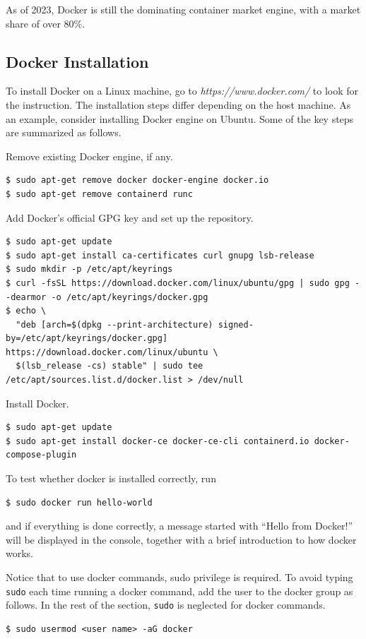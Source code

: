 As of 2023, Docker is still the dominating container market engine, with a market share of over $80\%$.

\subsection{Docker Installation}

To install Docker on a Linux machine, go to \textit{https://www.docker.com/} to look for the instruction. The installation steps differ depending on the host machine. As an example, consider installing Docker engine on Ubuntu. Some of the key steps are summarized as follows.

Remove existing Docker engine, if any.
\begin{lstlisting}
$ sudo apt-get remove docker docker-engine docker.io
$ sudo apt-get remove containerd runc
\end{lstlisting}
Add Docker's official GPG key and set up the repository.
\begin{lstlisting}
$ sudo apt-get update
$ sudo apt-get install ca-certificates curl gnupg lsb-release
$ sudo mkdir -p /etc/apt/keyrings
$ curl -fsSL https://download.docker.com/linux/ubuntu/gpg | sudo gpg --dearmor -o /etc/apt/keyrings/docker.gpg
$ echo \
  "deb [arch=$(dpkg --print-architecture) signed-by=/etc/apt/keyrings/docker.gpg] https://download.docker.com/linux/ubuntu \
  $(lsb_release -cs) stable" | sudo tee /etc/apt/sources.list.d/docker.list > /dev/null
\end{lstlisting}
Install Docker.
\begin{lstlisting}
$ sudo apt-get update
$ sudo apt-get install docker-ce docker-ce-cli containerd.io docker-compose-plugin
\end{lstlisting}
To test whether docker is installed correctly, run
\begin{lstlisting}
$ sudo docker run hello-world
\end{lstlisting}
and if everything is done correctly, a message started with ``Hello from Docker!'' will be displayed in the console, together with a brief introduction to how docker works.

Notice that to use docker commands, sudo privilege is required. To avoid typing \verb|sudo| each time running a docker command, add the user to the docker group as follows. In the rest of the section, \verb|sudo| is neglected for docker commands.
\begin{lstlisting}
$ sudo usermod <user name> -aG docker
\end{lstlisting}

